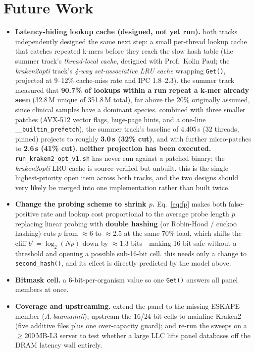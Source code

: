 \documentclass[10.5pt]{article}
\newcommand{\code}[1]{\texttt{\footnotesize #1}}
\begin{document}
\section{Future Work}

\begin{itemize}[nosep,leftmargin=1.4em]
  \item \textbf{Latency-hiding lookup cache (designed, not yet run).} both tracks independently designed the same next step: a small per-thread lookup cache that catches repeated k-mers before they reach the slow hash table (the summer track's \textit{thread-local cache}, designed with Prof.\ Kolin Paul; the \textit{kraken2opti} track's \textit{4-way set-associative LRU cache} wrapping \code{Get()}, projected at 9--12\% cache-miss rate and IPC 1.8--2.3). the summer track measured that \textbf{90.7\% of lookups within a run repeat a k-mer already seen} (32.8\,M unique of 351.8\,M total), far above the 20\% originally assumed, since clinical samples have a dominant species. combined with three smaller patches (AVX-512 vector flags, huge-page hints, and a one-line \code{\_\_builtin\_prefetch}), the summer track's baseline of 4.405\,s (32 threads, pinned) projects to roughly \textbf{3.0\,s (32\% cut)}, and with further micro-patches to \textbf{2.6\,s (41\% cut)}. \textbf{neither projection has been executed.} \code{run\_kraken2\_opt\_v1.sh} has never run against a patched binary; the \textit{kraken2opti} LRU cache is source-verified but unbuilt. this is the single highest-priority open item across both tracks, and the two designs should very likely be merged into one implementation rather than built twice.
  \item \textbf{Change the probing scheme to shrink $p$.} Eq.~\eqref{eq:fp} makes both false-positive rate and lookup cost proportional to the average probe length $p$. replacing linear probing with \textbf{double hashing} (or Robin-Hood / cuckoo hashing) cuts $p$ from $\approx$6 to $\approx$2.5 at the same 70\% load, which shifts the cliff $b^\star=\log_2(Np)$ down by $\approx1.3$ bits - making 16-bit safe without a threshold and opening a possible sub-16-bit cell. this needs only a change to \code{second\_hash()}, and its effect is directly predicted by the model above.
  \item \textbf{Bitmask cell.} a 6-bit-per-organism value so one \code{Get()} answers all panel members at once.
  \item \textbf{Coverage and upstreaming.} extend the panel to the missing ESKAPE member (\textit{A.\,baumannii}); upstream the 16/24-bit cells to mainline Kraken2 (five additive files plus one over-capacity guard); and re-run the sweeps on a $\geq$200\,MB-L3 server to test whether a large LLC lifts panel databases off the DRAM latency wall entirely.
\end{itemize}
\end{document}
